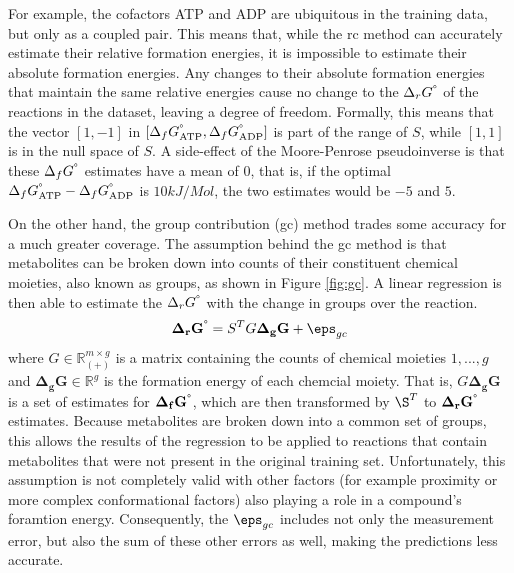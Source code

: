 \documentclass[10pt,letterpaper]{article}
\newcommand{\sdgf}{\Delta_fG^{\degree}}
\newcommand{\sdgr}{\Delta_rG^{\degree}}
\newcommand{\sdgg}{\Delta_gG}
\newcommand{\bsdgg}{\mathbf{\sdgg}}
\newcommand{\bsdgf}{\mathbf{\sdgf}}
\newcommand{\bsdgr}{\mathbf{\sdgr}}
\begin{document}
For example, the cofactors ATP and ADP are ubiquitous in the training data, but only as a coupled pair.
This means that, while the rc method can accurately estimate their relative formation energies, it is impossible to estimate their absolute formation energies.
Any changes to their absolute formation energies that maintain the same relative energies cause no change to the $\sdgr$ of the reactions in the dataset, leaving a degree of freedom.
Formally, this means that the vector $[1,-1]$ in $[\sdgf_{\text{ATP}}, \sdgf_{\text{ADP}}]$ is part of the range of $S$, while $[1, 1]$ is in the null space of $S$.
A side-effect of the Moore-Penrose pseudoinverse is that these $\sdgf$ estimates have a mean of 0, that is, if the optimal $\sdgf_{\text{ATP}} - \sdgf_{\text{ADP}}$ is $10kJ/Mol$, the two estimates would be $-5$ and $5$.

On the other hand, the group contribution (gc) method trades some accuracy for a much greater coverage.
The assumption behind the gc method is that metabolites can be broken down into counts of their constituent chemical moieties, also known as groups, as shown in Figure \ref{fig:gc}.
A linear regression is then able to estimate the $\sdgr$ with the change in groups over the reaction.
\begin{align}
    \bsdgr = S^T G \bsdgg + \eps_{gc}\\ %
\end{align}
where $G \in \mathbb{R}_(+)^{m \times g}$ is a matrix containing the counts of chemical moieties $1,...,g$ and $\bsdgg \in \mathbb{R}^{g}$ is the formation energy of each chemcial moiety.
That is, $G \bsdgg$ is a set of estimates for $\bsdgf$, which are then transformed by $\S^T$ to $\bsdgr$ estimates.
Because metabolites are broken down into a common set of groups, this allows the results of the regression to be applied to reactions that contain metabolites that were not present in the original training set.
Unfortunately, this assumption is not completely valid with other factors (for example proximity or more complex conformational factors) also playing a role in a compound's foramtion energy.
Consequently, the $\eps_{gc}$ includes not only the measurement error, but also the sum of these other errors as well, making the predictions less accurate.
\end{document}

